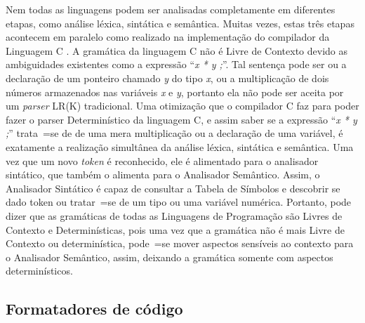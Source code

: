 {    Nem todas as linguagens podem ser analisadas completamente em diferentes etapas,
    como análise léxica, sintática e semântica. Muitas vezes,
    estas três etapas acontecem em paralelo como realizado na implementação do
    compilador da Linguagem C \cite{jourdan2017,whyCcannotBeParsedWithALR1Parser}.
    A gramática da linguagem C não é Livre de Contexto devido as
    ambiguidades existentes como a expressão ``\textit{x * y ;}''.
    Tal sentença pode ser ou a declaração de um ponteiro chamado \textit{y} do tipo \textit{x},
    ou a multiplicação de dois números armazenados nas variáveis \textit{x} e
    \textit{y},
    portanto ela não pode ser aceita por um \textit{parser} LR(K) tradicional.
    Uma otimização que o compilador C faz para poder fazer o parser Determinístico da linguagem C,
    e assim saber se a expressão ``\textit{x * y ;}'' trata~=se de
    de uma mera multiplicação ou a declaração de uma variável,
    é exatamente a realização simultânea da análise léxica,
    sintática e
    semântica.
    Uma vez que um novo \textit{token} é reconhecido,
    ele é alimentado para o analisador sintático,
    que também o alimenta para o Analisador Semântico.
    Assim,
    o Analisador Sintático é capaz de consultar a Tabela de Símbolos e
    descobrir se dado token ou tratar~=se de um tipo ou uma variável numérica.
    Portanto,
    pode dizer que as gramáticas de todas as Linguagens de Programação são Livres de Contexto e
    Determinísticas,
    pois uma vez que a gramática não é mais Livre de Contexto ou determinística,
    pode~=se mover aspectos sensíveis ao contexto para o Analisador Semântico,
    assim,
    deixando a gramática somente com aspectos determinísticos.
}

\subsection{Formatadores de código}

